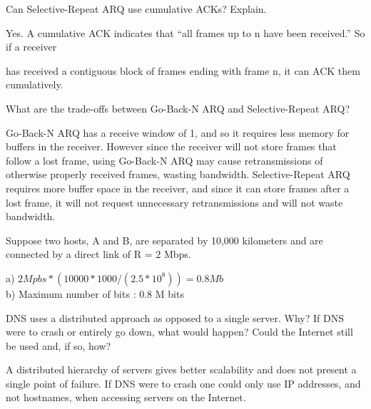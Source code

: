 \documentclass[answers,addpoints]{exam}
\begin{document}
\begin{questions}
\question
Can Selective-Repeat ARQ use cumulative ACKs? Explain.
\fillwithdottedlines{1in}
\begin{solution}
Yes. A cumulative ACK indicates that “all frames up to n have been received.” So if a receiver

has received a contiguous block of frames ending with frame n, it can ACK them cumulatively.
\end{solution}

\question
What are the trade-offs between Go-Back-N ARQ and Selective-Repeat ARQ?
\fillwithdottedlines{1in}

\begin{solution}
Go-Back-N ARQ has a receive window of 1, and so it requires less memory for buffers in the receiver. However since the receiver will not store frames that follow a lost frame, using Go-Back-N ARQ may cause retransmissions of otherwise properly received frames, wasting bandwidth. Selective-Repeat ARQ requires more buffer space in the receiver, and since it can store frames after a lost frame, it will not request unnecessary retransmissions and will not waste bandwidth.
\end{solution}

\question
Suppose two hosts, A and B, are separated by 10,000 kilometers and are connected by a direct link of R = 2 Mbps. 

\begin{solution}
a) $2 Mpbs * (10000*1000 / (2.5*10^8)) = 0.8 Mb$\\
b) Maximum number of bits : $0.8$ M bits
\end{solution}

\question
DNS uses a distributed approach as opposed to a single server. Why? If DNS were to crash or entirely go down, what would happen? Could the Internet still be used and, if so, how?
\fillwithdottedlines{1in}
\begin{solution}
A distributed hierarchy of servers gives better scalability and does not present a single point of failure. If DNS were to crash one could only use IP addresses, and not hostnames, when accessing servers on the Internet.
\end{solution}


\end{questions}
\end{document}
